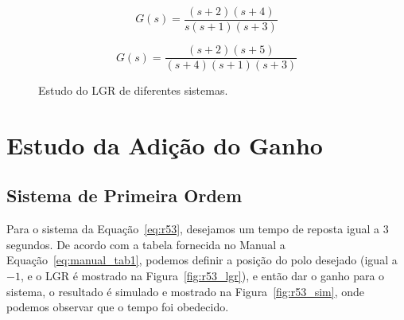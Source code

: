 \documentclass[a4paper]{article}
\begin{document}
\begin{equation}
   G(s)=\frac{(s+2)(s+4)}{s(s+1)(s+3)}
   \label{eq:r522}
\end{equation}

\begin{equation}
   G(s)=\frac{(s+2)(s+5)}{(s+4)(s+1)(s+3)}
   \label{eq:r523}
\end{equation}

\begin{figure}[h]
   \caption{Estudo do LGR de diferentes sistemas.}
   \label{fig:r522}
\end{figure}

\section{Estudo da Adição do Ganho}

\subsection{Sistema de Primeira Ordem}
Para o sistema da Equação~\ref{eq:r53}, desejamos um tempo de reposta igual a $3$
segundos. De acordo com a tabela fornecida no Manual a Equação~\ref{eq:manual_tab1},
podemos definir a posição do polo desejado (igual a $-1$, e o LGR é mostrado na
Figura~\ref{fig:r53_lgr}), e então dar o ganho para o sistema,
o resultado é simulado e mostrado na Figura~\ref{fig:r53_sim}, onde
podemos observar que o tempo foi obedecido.
\end{document}
